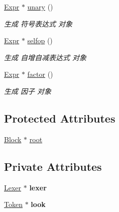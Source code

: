 \begin{DoxyCompactItemize}
\mbox{\label{class_parser_ac58cd88a976f4a7d147f5f815724f6a6}} 
\hyperlink{class_expr}{Expr} $\ast$ \hyperlink{class_parser_ac58cd88a976f4a7d147f5f815724f6a6}{unary} ()
\begin{DoxyCompactList}\small\item\em 生成 符号表达式 对象 \end{DoxyCompactList}\item 
\mbox{\label{class_parser_a3d5348cd92711fd39aea2b959e029e99}} 
\hyperlink{class_expr}{Expr} $\ast$ \hyperlink{class_parser_a3d5348cd92711fd39aea2b959e029e99}{selfop} ()
\begin{DoxyCompactList}\small\item\em 生成 自增自减表达式 对象 \end{DoxyCompactList}\item 
\mbox{\label{class_parser_ac85a997e91604de1d3505b3c8aaddf3b}} 
\hyperlink{class_expr}{Expr} $\ast$ \hyperlink{class_parser_ac85a997e91604de1d3505b3c8aaddf3b}{factor} ()
\begin{DoxyCompactList}\small\item\em 生成 因子 对象 \end{DoxyCompactList}\end{DoxyCompactItemize}
\subsection*{Protected Attributes}
\begin{DoxyCompactItemize}
\item 
\hyperlink{class_block}{Block} $\ast$ \hyperlink{class_parser_a2c2aa893bb15b76ceea0330cad0c75cb}{root}
\end{DoxyCompactItemize}
\subsection*{Private Attributes}
\begin{DoxyCompactItemize}
\item 
\mbox{\label{class_parser_a8a8214126b0b0455e3ce375f3e9b20bf}} 
\hyperlink{class_lexer}{Lexer} $\ast$ {\bfseries lexer}
\item 
\mbox{\label{class_parser_ac5d56e87794ceab4e8346bf4a60a5625}} 
\hyperlink{class_token}{Token} $\ast$ {\bfseries look}
\end{DoxyCompactItemize}


